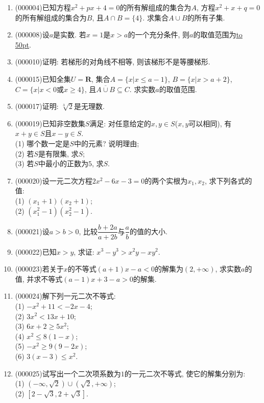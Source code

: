 \documentclass[10pt,a4paper]{article}
\newcommand{\blank}[1]{\underline{\hbox to #1pt{}}}
\begin{document}
\begin{enumerate}[1.]

\item {\tiny (000004)}已知方程$x^2+px+4=0$的所有解组成的集合为$A$, 方程$x^2+x+q=0$的所有解组成的集合为$B$, 且$A\cap B=\{4\}$. 求集合$A\cup B$的所有子集.
\item {\tiny (000008)}设$a$是实数. 若$x=1$是$x>a$的一个充分条件, 则$a$的取值范围为\blank{50}.
\item {\tiny (000010)}证明: 若梯形的对角线不相等, 则该梯形不是等腰梯形.
\item {\tiny (000015)}已知全集$U=\mathbf{R}$, 集合$A=\{x|x\le a-1\}$, $B=\{x|x>a+2\}$, $C=\{x|x<0\text{或}x\ge 4\}$, 且$\overline{A\cup B}\subseteq C$. 求实数$a$的取值范围.
\item {\tiny (000017)}证明: $\sqrt[3]{2}$是无理数.
\item {\tiny (000019)}已知非空数集$S$满足: 对任意给定的$x,y\in S$($x,y$可以相同), 有$x+y\in S$且$x-y\in S$.\\
(1) 哪个数一定是$S$中的元素? 说明理由;\\
(2) 若$S$是有限集, 求$S$;\\
(3) 若$S$中最小的正数为$5$, 求$S$.
\item {\tiny (000020)}设一元二次方程$2x^2-6x-3=0$的两个实根为$x_1,x_2$, 求下列各式的值:\\
(1) $(x_1+1)(x_2+1)$;\\
(2) $(x_1^2-1)(x_2^2-1)$.
\item {\tiny (000021)}设$a>b>0$, 比较$\dfrac{b+2a}{a+2b}$与$\dfrac ab$的值的大小.
\item {\tiny (000022)}已知$x>y$, 求证: $x^3-y^3>x^2y-xy^2$.
\item {\tiny (000023)}若关于$x$的不等式$(a+1)x-a<0$的解集为$(2,+\infty)$, 求实数$a$的值, 并求不等式$(a-1)x+3-a>0$的解集.
\item {\tiny (000024)}解下列一元二次不等式:\\
(1) $-x^2+11<-2x-4$;\\
(2) $3x^2<13x+10$;\\
(3) $6x+2\ge 5x^2$;\\
(4) $x^2\le 8(1-x)$;\\
(5) $-x^2\ge 9(9-2x)$;\\
(6) $3(x-3)\le x^2$.
\item {\tiny (000025)}试写出一个二次项系数为$1$的一元二次不等式, 使它的解集分别为:\\
(1) $(-\infty, \sqrt 2)\cup  (\sqrt 2, +\infty)$;\\
(2) $[2-\sqrt 3, 2+\sqrt 3]$.

\end{enumerate}
\end{document}
